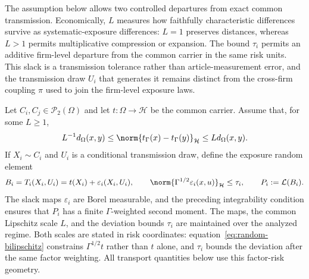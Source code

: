 The assumption below allows two controlled departures from exact common transmission.
Economically, $L$ measures how faithfully characteristic differences survive
as systematic-exposure differences: $L=1$ preserves distances, whereas $L>1$
permits multiplicative compression or expansion.
The bound $\tau_i$ permits an additive firm-level departure from the common
carrier in the same risk units.
This slack is a transmission tolerance rather than article-measurement error,
and the transmission draw $U_i$ that generates it remains distinct from the
cross-firm coupling $\pi$ used to join the firm-level exposure laws.
\begin{assumption}
  \label{ass:random-common-map}
  Let $C_i,C_j\in\mathcal P_2(\Omega)$ and let $t:\Omega\to\mathcal H$ be
  the common carrier. Assume that, for some $L\ge1$,
  \begin{equation}\label{eq:random-bilipschitz}
    L^{-1}d_\Omega(x,y)\le\norm{t_\Gamma(x)-t_\Gamma(y)}_{\mathcal H}
    \le Ld_\Omega(x,y).
  \end{equation}
  If $X_i\sim C_i$ and $U_i$ is a conditional transmission draw,
  define the exposure random element
  \begin{equation}\label{eq:random-exposure-pushforward}
    B_i=T_i(X_i,U_i)
    =t(X_i)+\varepsilon_i(X_i,U_i),
    \qquad \norm{\Gamma^{1/2}\varepsilon_i(x,u)}_{\mathcal H}\le\tau_i,
    \qquad P_i:=\mathcal L(B_i).
  \end{equation}
  The slack maps $\varepsilon_i$ are Borel measurable, and the preceding
  integrability condition ensures that $P_i$ has a finite
  $\Gamma$-weighted second moment. The maps, the common Lipschitz scale $L$,
  and the deviation bounds $\tau_i$ are maintained over the analyzed regime.
  Both scales are stated in risk coordinates:
  equation~\ref{eq:random-bilipschitz}
  constrains $\Gamma^{1/2}t$ rather than $t$ alone, and $\tau_i$ bounds the
  deviation after the same factor weighting. All transport quantities below
  use this factor-risk geometry.
\end{assumption}

